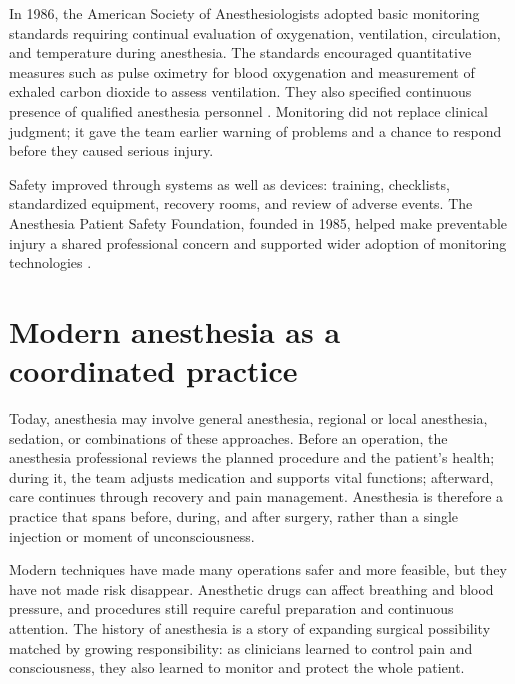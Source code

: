 \documentclass[12pt,oneside]{book}
\begin{document}
In 1986, the American Society of Anesthesiologists adopted basic monitoring
standards requiring continual evaluation of oxygenation, ventilation,
circulation, and temperature during anesthesia. The standards encouraged
quantitative measures such as pulse oximetry for blood oxygenation and
measurement of exhaled carbon dioxide to assess ventilation. They also
specified continuous presence of qualified anesthesia personnel
\cite{asamonitoring}. Monitoring did not replace clinical judgment; it gave
the team earlier warning of problems and a chance to respond before they
caused serious injury.

Safety improved through systems as well as devices: training, checklists,
standardized equipment, recovery rooms, and review of adverse events. The
Anesthesia Patient Safety Foundation, founded in 1985, helped make preventable
injury a shared professional concern and supported wider adoption of
monitoring technologies \cite{apsfhistory}.

\section{Modern anesthesia as a coordinated practice}
Today, anesthesia may involve general anesthesia, regional or local
anesthesia, sedation, or combinations of these approaches. Before an
operation, the anesthesia professional reviews the planned procedure and the
patient's health; during it, the team adjusts medication and supports vital
functions; afterward, care continues through recovery and pain management.
Anesthesia is therefore a practice that spans before, during, and after
surgery, rather than a single injection or moment of unconsciousness.

Modern techniques have made many operations safer and more feasible, but they
have not made risk disappear. Anesthetic drugs can affect breathing and blood
pressure, and procedures still require careful preparation and continuous
attention. The history of anesthesia is a story of expanding surgical
possibility matched by growing responsibility: as clinicians learned to
control pain and consciousness, they also learned to monitor and protect the
whole patient.
\end{document}

